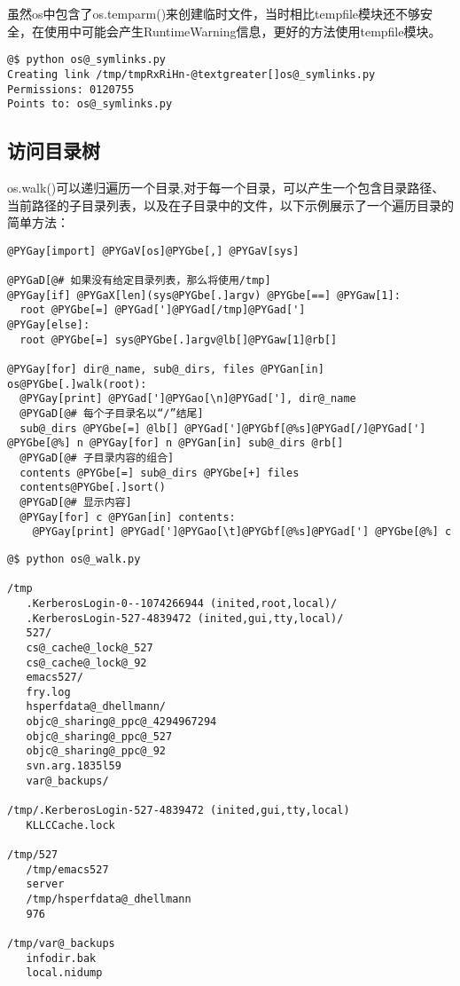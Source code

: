 \documentclass[a4paper,10pt,english]{manual}
\begin{document}
虽然os中包含了os.temparm()来创建临时文件，当时相比tempfile模块还不够安全，在使用中可能会产生RuntimeWarning信息，更好的方法使用tempfile模块。

\begin{Verbatim}[commandchars=@\[\]]
@$ python os@_symlinks.py
Creating link /tmp/tmpRxRiHn-@textgreater[]os@_symlinks.py
Permissions: 0120755
Points to: os@_symlinks.py
\end{Verbatim}


\subsection{访问目录树}

os.walk()可以递归遍历一个目录,对于每一个目录，可以产生一个包含目录路径、当前路径的子目录列表，以及在子目录中的文件，以下示例展示了一个遍历目录的简单方法：

\begin{Verbatim}[commandchars=@\[\]]
@PYGay[import] @PYGaV[os]@PYGbe[,] @PYGaV[sys]

@PYGaD[@# 如果没有给定目录列表，那么将使用/tmp]
@PYGay[if] @PYGaX[len](sys@PYGbe[.]argv) @PYGbe[==] @PYGaw[1]:
  root @PYGbe[=] @PYGad[']@PYGad[/tmp]@PYGad[']
@PYGay[else]:
  root @PYGbe[=] sys@PYGbe[.]argv@lb[]@PYGaw[1]@rb[]

@PYGay[for] dir@_name, sub@_dirs, files @PYGan[in] os@PYGbe[.]walk(root):
  @PYGay[print] @PYGad[']@PYGao[\n]@PYGad['], dir@_name
  @PYGaD[@# 每个子目录名以“/”结尾]
  sub@_dirs @PYGbe[=] @lb[] @PYGad[']@PYGbf[@%s]@PYGad[/]@PYGad['] @PYGbe[@%] n @PYGay[for] n @PYGan[in] sub@_dirs @rb[]
  @PYGaD[@# 子目录内容的组合]
  contents @PYGbe[=] sub@_dirs @PYGbe[+] files
  contents@PYGbe[.]sort()
  @PYGaD[@# 显示内容]
  @PYGay[for] c @PYGan[in] contents:
    @PYGay[print] @PYGad[']@PYGao[\t]@PYGbf[@%s]@PYGad['] @PYGbe[@%] c
\end{Verbatim}

\begin{Verbatim}[commandchars=@\[\]]
@$ python os@_walk.py

/tmp
   .KerberosLogin-0--1074266944 (inited,root,local)/
   .KerberosLogin-527-4839472 (inited,gui,tty,local)/
   527/
   cs@_cache@_lock@_527
   cs@_cache@_lock@_92
   emacs527/
   fry.log
   hsperfdata@_dhellmann/
   objc@_sharing@_ppc@_4294967294
   objc@_sharing@_ppc@_527
   objc@_sharing@_ppc@_92
   svn.arg.1835l59
   var@_backups/

/tmp/.KerberosLogin-527-4839472 (inited,gui,tty,local)
   KLLCCache.lock

/tmp/527
   /tmp/emacs527
   server
   /tmp/hsperfdata@_dhellmann
   976

/tmp/var@_backups
   infodir.bak
   local.nidump
\end{Verbatim}
\end{document}
